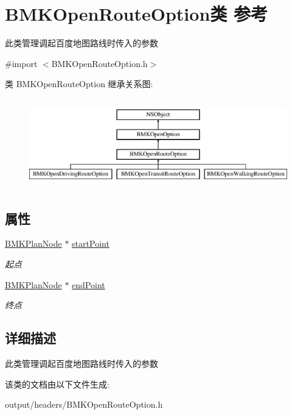 \hypertarget{interface_b_m_k_open_route_option}{}\section{B\+M\+K\+Open\+Route\+Option类 参考}
\label{interface_b_m_k_open_route_option}


此类管理调起百度地图路线时传入的参数  




{\ttfamily \#import $<$B\+M\+K\+Open\+Route\+Option.\+h$>$}

类 B\+M\+K\+Open\+Route\+Option 继承关系图\+:\begin{figure}[H]
\begin{center}
\leavevmode
\includegraphics[height=3.909250cm]{interface_b_m_k_open_route_option}
\end{center}
\end{figure}
\subsection*{属性}
\begin{DoxyCompactItemize}
\item 
\hypertarget{interface_b_m_k_open_route_option_a8c11c826122d6a0aaec4a0881b297459}{}\hyperlink{interface_b_m_k_plan_node}{B\+M\+K\+Plan\+Node} $\ast$ \hyperlink{interface_b_m_k_open_route_option_a8c11c826122d6a0aaec4a0881b297459}{start\+Point}\label{interface_b_m_k_open_route_option_a8c11c826122d6a0aaec4a0881b297459}

\begin{DoxyCompactList}\small\item\em 起点 \end{DoxyCompactList}\item 
\hypertarget{interface_b_m_k_open_route_option_ae0a5de8c2e6c374345f6f87bff3a6116}{}\hyperlink{interface_b_m_k_plan_node}{B\+M\+K\+Plan\+Node} $\ast$ \hyperlink{interface_b_m_k_open_route_option_ae0a5de8c2e6c374345f6f87bff3a6116}{end\+Point}\label{interface_b_m_k_open_route_option_ae0a5de8c2e6c374345f6f87bff3a6116}

\begin{DoxyCompactList}\small\item\em 终点 \end{DoxyCompactList}\end{DoxyCompactItemize}


\subsection{详细描述}
此类管理调起百度地图路线时传入的参数 

该类的文档由以下文件生成\+:\begin{DoxyCompactItemize}
\item 
output/headers/B\+M\+K\+Open\+Route\+Option.\+h\end{DoxyCompactItemize}
